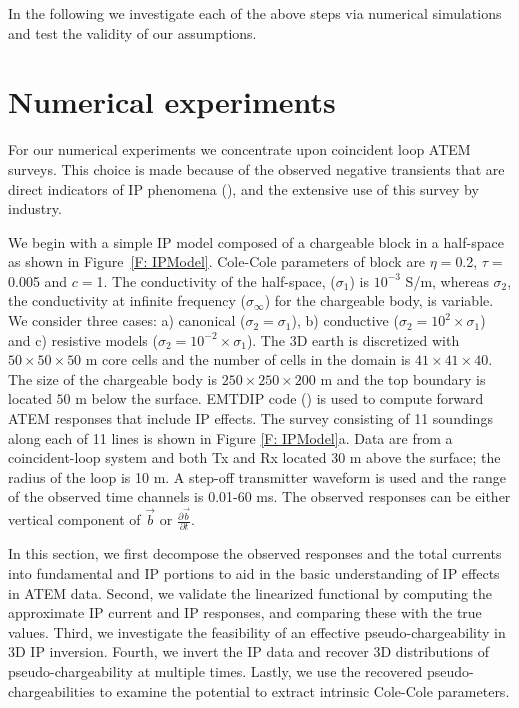 \documentclass[extra,mreferee]{gji}
\newcommand{\siginf}{\sigma_\infty}
\renewcommand {\b}  { {\vec b} }
\begin{document}
In the following we investigate each of the above steps via numerical simulations and test the validity of our assumptions. 


\section{Numerical experiments}
\label{section: numerical_examples}
For our numerical experiments we concentrate upon coincident loop ATEM surveys. This choice is made because of the observed negative transients that are direct indicators of IP phenomena (\cite{Kratzer2012,Kang2015a,Kang2015b,Doug2015}), and the extensive  use of this survey  by industry.  

We begin with a simple IP model composed of  a chargeable block in a half-space as shown in Figure~\ref{F: IPModel}.
Cole-Cole parameters of block are  $\eta=$0.2, $\tau=$0.005 and $c=$1.
The conductivity  of the half-space, ($\sigma_1$) is  $10^{-3}$ S/m, whereas $\sigma_2$, 
the conductivity at infinite frequency ($\siginf$) for the chargeable body, is variable.  
We consider three cases: a) canonical ($\sigma_2=\sigma_1$), b) conductive ($\sigma_2=10^2\times\sigma_1$) and c) resistive models ($\sigma_2=10^{-2}\times\sigma_1$).
The 3D earth is discretized with  $50\times50\times50$ m core cells and the number of cells in the domain is $41\times41\times40$.
The size of the chargeable body is $250\times250\times200$ m and the top boundary is located  $50$ m below the surface.
EMTDIP code (\cite{Marchant2014}) is used to compute forward ATEM responses that include IP effects. The survey consisting of 11 soundings along each of 11 lines is shown in Figure \ref{F: IPModel}a.
Data are from a  coincident-loop system and both Tx and Rx located 30 m above the surface; the radius of the loop is 10 m.
A step-off transmitter waveform is used and the range of the observed time channels is 0.01-60 ms. The observed responses can be either vertical component of $\b$ or $\frac{\partial \b}{\partial t}$.

In this section, we first decompose the observed responses and the total currents into fundamental and IP portions to aid in the basic understanding of IP effects in ATEM data. 
Second, we validate the linearized functional by computing the approximate IP current and IP responses, and comparing these  with the true values. 
Third, we investigate the feasibility of an effective pseudo-chargeability in 3D IP inversion. 
Fourth, we invert the IP data and recover 3D distributions of pseudo-chargeability at multiple times.  Lastly, we use the recovered pseudo-chargeabilities to examine the potential to extract intrinsic Cole-Cole parameters. 
\end{document}
